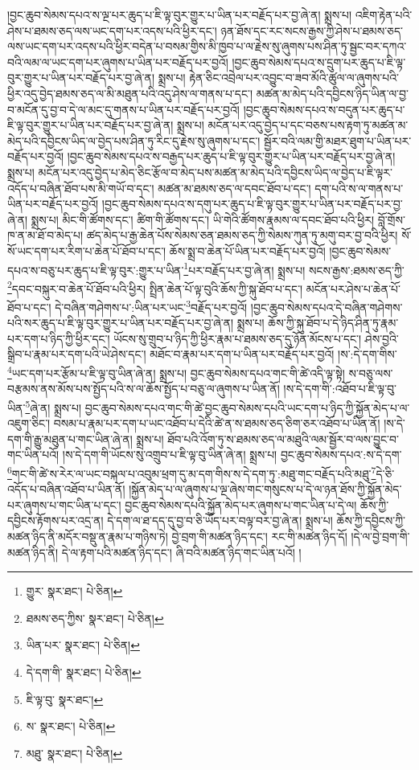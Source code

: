 །བྱང་ཆུབ་སེམས་དཔའ་ས་ལྔ་པར་ཆུད་པ་ཇི་ལྟ་བུར་གྱུར་པ་ཡིན་པར་བརྗོད་པར་བྱ་ཞེ་ན། སྨྲས་པ། འཇིག་རྟེན་པའི་ཤེས་པ་ཐམས་ཅད་ལས་ཡང་དག་པར་འདས་པའི་ཕྱིར་དང་། ཉན་ཐོས་དང་རང་སངས་རྒྱས་ཀྱི་ཤེས་པ་ཐམས་ཅད་ལས་ཡང་དག་པར་འདས་པའི་ཕྱིར་བདེན་པ་བསམ་གྱིས་མི་ཁྱབ་པ་ལ་རྗེས་སུ་ཞུགས་པས་ཤིན་ཏུ་སྦྱང་བར་དཀའ་བའི་ལམ་ལ་ཡང་དག་པར་ཞུགས་པ་ཡིན་པར་བརྗོད་པར་བྱའོ། །བྱང་ཆུབ་སེམས་དཔའ་ས་དྲུག་པར་ཆུད་པ་ཇི་ལྟ་བུར་གྱུར་པ་ཡིན་པར་བརྗོད་པར་བྱ་ཞེ་ན། སྨྲས་པ། རྟེན་ཅིང་འབྲེལ་པར་འབྱུང་བ་ཟབ་མོའི་ཚུལ་ལ་ཞུགས་པའི་ཕྱིར་འདུ་བྱེད་ཐམས་ཅད་ལ་མི་མཐུན་པའི་འདུ་ཤེས་ལ་གནས་པ་དང་། མཚན་མ་མེད་པའི་དབྱིངས་ཉིད་ཡིན་ལ་བྱ་བ་མངོན་དུ་བྱ་བ་དེ་ལ་མང་དུ་གནས་པ་ཡིན་པར་བརྗོད་པར་བྱའོ། །བྱང་ཆུབ་སེམས་དཔའ་ས་བདུན་པར་ཆུད་པ་ཇི་ལྟ་བུར་གྱུར་པ་ཡིན་པར་བརྗོད་པར་བྱ་ཞེ་ན། སྨྲས་པ། མངོན་པར་འདུ་བྱེད་པ་དང་བཅས་པས་རྟག་ཏུ་མཚན་མ་མེད་པའི་དབྱིངས་ཡིད་ལ་བྱེད་པས་ཤིན་ཏུ་རིང་དུ་རྗེས་སུ་ཞུགས་པ་དང་། སྦྱོར་བའི་ལམ་གྱི་མཐར་ཐུག་པ་ཡིན་པར་བརྗོད་པར་བྱའོ། །བྱང་ཆུབ་སེམས་དཔའ་ས་བརྒྱད་པར་ཆུད་པ་ཇི་ལྟ་བུར་གྱུར་པ་ཡིན་པར་བརྗོད་པར་བྱ་ཞེ་ན། སྨྲས་པ། མངོན་པར་འདུ་བྱེད་པ་མེད་ཅིང་རྩོལ་བ་མེད་པས་མཚན་མ་མེད་པའི་དབྱིངས་ཡིད་ལ་བྱེད་པ་ཇི་ལྟར་འདོད་པ་བཞིན་ཐོབ་པས་མི་གཡོ་བ་དང་། མཚན་མ་ཐམས་ཅད་ལ་དབང་ཐོབ་པ་དང་། དག་པའི་ས་ལ་གནས་པ་ཡིན་པར་བརྗོད་པར་བྱའོ། །བྱང་ཆུབ་སེམས་དཔའ་ས་དགུ་པར་ཆུད་པ་ཇི་ལྟ་བུར་གྱུར་པ་ཡིན་པར་བརྗོད་པར་བྱ་ཞེ་ན། སྨྲས་པ། མིང་གི་ཚོགས་དང་། ཚིག་གི་ཚོགས་དང་། ཡི་གེའི་ཚོགས་རྣམས་ལ་དབང་ཐོབ་པའི་ཕྱིར། བློ་གྲོས་ཁ་ན་མ་ཐོ་བ་མེད་པ། ཚད་མེད་པ་རྒྱ་ཆེན་པོས་སེམས་ཅན་ཐམས་ཅད་ཀྱི་སེམས་ཀུན་ཏུ་མགུ་བར་བྱ་བའི་ཕྱིར། སོ་སོ་ཡང་དག་པར་རིག་པ་ཆེན་པོ་ཐོབ་པ་དང་། ཆོས་སྨྲ་བ་ཆེན་པོ་ཡིན་པར་བརྗོད་པར་བྱའོ། །བྱང་ཆུབ་སེམས་དཔའ་ས་བཅུ་པར་ཆུད་པ་ཇི་ལྟ་བུར་:གྱུར་པ་ཡིན་\footnote{གྱུར་  སྣར་ཐང་།  པེ་ཅིན། }པར་བརྗོད་པར་བྱ་ཞེ་ན། སྨྲས་པ། སངས་རྒྱས་:ཐམས་ཅད་ཀྱི་\footnote{ཐམས་ཅད་ཀྱིས་  སྣར་ཐང་།  པེ་ཅིན། }དབང་བསྐུར་བ་ཆེན་པོ་ཐོབ་པའི་ཕྱིར། སྤྲིན་ཆེན་པོ་ལྟ་བུའི་ཆོས་ཀྱི་སྐུ་ཐོབ་པ་དང་། མངོན་པར་ཤེས་པ་ཆེན་པོ་ཐོབ་པ་དང་། དེ་བཞིན་གཤེགས་པ་:ཡིན་པར་ཡང་\footnote{ཡིན་པར་  སྣར་ཐང་།  པེ་ཅིན། }བརྗོད་པར་བྱའོ། །བྱང་ཆུབ་སེམས་དཔའ་དེ་བཞིན་གཤེགས་པའི་སར་ཆུད་པ་ཇི་ལྟ་བུར་གྱུར་པ་ཡིན་པར་བརྗོད་པར་བྱ་ཞེ་ན། སྨྲས་པ། ཆོས་ཀྱི་སྐུ་ཐོབ་པ་དེ་ཉིད་ཤིན་ཏུ་རྣམ་པར་དག་པ་ཉིད་ཀྱི་ཕྱིར་དང་། ཡོངས་སུ་གྲུབ་པ་ཉིད་ཀྱི་ཕྱིར་རྣམ་པ་ཐམས་ཅད་དུ་ཉོན་མོངས་པ་དང་། ཤེས་བྱའི་སྒྲིབ་པ་རྣམ་པར་དག་པའི་ཡེ་ཤེས་དང་། མཐོང་བ་རྣམ་པར་དག་པ་ཡིན་པར་བརྗོད་པར་བྱའོ། །ས་:དེ་དག་གིས་\footnote{དེ་དག་གི་  སྣར་ཐང་།  པེ་ཅིན། }ཡང་དག་པར་རྩོམ་པ་ཇི་ལྟ་བུ་ཡིན་ཞེ་ན། སྨྲས་པ། བྱང་ཆུབ་སེམས་དཔའ་གང་གི་ཚེ་འདི་ལྟ་སྟེ། ས་བཅུ་ལས་བརྩམས་ནས་མོས་པས་སྤྱོད་པའི་ས་ལ་ཆོས་སྤྱོད་པ་བཅུ་ལ་ཞུགས་པ་ཡིན་ནོ། །ས་དེ་དག་གི་:འཐོབ་པ་ཇི་ལྟ་བུ་ཡིན་\footnote{ཇི་ལྟ་བུ་  སྣར་ཐང་། }ཞེ་ན། སྨྲས་པ། བྱང་ཆུབ་སེམས་དཔའ་གང་གི་ཚེ་བྱང་ཆུབ་སེམས་དཔའི་ཡང་དག་པ་ཉིད་ཀྱི་སྐྱོན་མེད་པ་ལ་འཇུག་ཅིང་། བསམ་པ་རྣམ་པར་དག་པ་ཡང་འཐོབ་པ་དེའི་ཚེ་ན་ས་ཐམས་ཅད་ཅིག་ཅར་འཐོབ་པ་ཡིན་ནོ། །ས་དེ་དག་གི་རྒྱུ་མཐུན་པ་གང་ཡིན་ཞེ་ན། སྨྲས་པ། ཐོབ་པའི་འོག་ཏུ་ས་ཐམས་ཅད་ལ་མཐུའི་ལམ་སྦྱོར་བ་ལས་བྱུང་བ་གང་ཡིན་པའོ། །ས་དེ་དག་གི་ཡོངས་སུ་འགྲུབ་པ་ཇི་ལྟ་བུ་ཡིན་ཞེ་ན། སྨྲས་པ། བྱང་ཆུབ་སེམས་དཔའ་:ས་དེ་དག་\footnote{ས་  སྣར་ཐང་།  པེ་ཅིན། }གང་གི་ཚེ་ས་རེར་ལ་ཡང་བསྐལ་པ་འབུམ་ཕྲག་དུ་མ་དག་གིས་ས་དེ་དག་ཏུ་:མཐུ་གང་བརྗོད་པའི་མཐུ་\footnote{མཐུ་  སྣར་ཐང་།  པེ་ཅིན། }དེ་ཅི་འདོད་པ་བཞིན་འཐོབ་པ་ཡིན་ནོ། །སྐྱོན་མེད་པ་ལ་ཞུགས་པ་ལྔ་ཞེས་གང་གསུངས་པ་དེ་ལ་ཉན་ཐོས་ཀྱི་སྐྱོན་མེད་པར་ཞུགས་པ་གང་ཡིན་པ་དང་། བྱང་ཆུབ་སེམས་དཔའི་སྐྱོན་མེད་པར་ཞུགས་པ་གང་ཡིན་པ་དེ་ལ། ཆོས་ཀྱི་དབྱིངས་རྟོགས་པར་འདྲ་ན། དེ་དག་ལ་ཐ་དད་དུ་བྱ་བ་ཅི་ཡོད་པར་བལྟ་བར་བྱ་ཞེ་ན། སྨྲས་པ། ཆོས་ཀྱི་དབྱིངས་ཀྱི་མཚན་ཉིད་ནི་མདོར་བསྡུ་ན་རྣམ་པ་གཉིས་ཏེ། བྱེ་བྲག་གི་མཚན་ཉིད་དང་། རང་གི་མཚན་ཉིད་དོ། །དེ་ལ་བྱེ་བྲག་གི་མཚན་ཉིད་ནི། དེ་ལ་རྟག་པའི་མཚན་ཉིད་དང་། ཞི་བའི་མཚན་ཉིད་གང་ཡིན་པའོ། །
